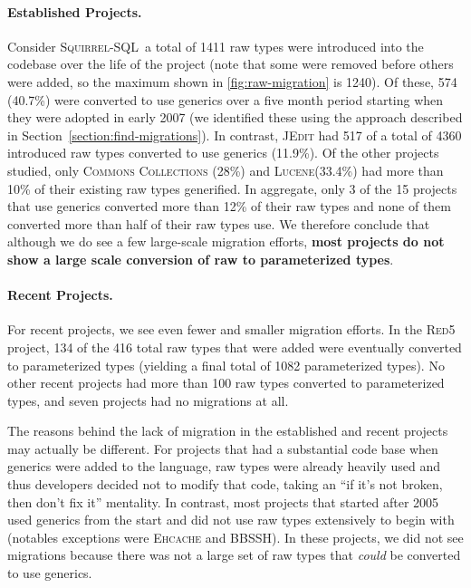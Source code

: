 \documentclass{svjour3}
\newcommand{\squirrelsql}{\textsc{Squirrel-SQL}\xspace}
\newcommand{\jedit}{\textsc{JEdit}\xspace}
\newcommand{\lucene}{\textsc{Lucene}\xspace}
\newcommand{\commons}{\textsc{Commons Collections}\xspace}
\newcommand{\bbssh}{\textsc{BBSSH}\xspace}
\newcommand{\ehcache}{\textsc{Ehcache}\xspace}
\newcommand{\red}{\textsc{Red5}\xspace}
\begin{document}

\paragraph{Established Projects.}
Consider \squirrelsql\textemdash~a total of 1411 raw types were introduced into the codebase
over the life of the project (note that some were removed before others were
added, so the maximum shown in \autoref{fig:raw-migration} is 1240).  Of these,
574 (40.7\%) were converted to use generics over a five month period starting
when they were adopted in early 2007 (we identified these using the approach
described in Section~\ref{section:find-migrations}). In contrast, \jedit had 517 of a total of 
4360 introduced raw types converted to use generics (11.9\%). 
Of the other projects studied, only \commons
(28\%) and \lucene (33.4\%) had more than 10\% of their existing raw types
generified.  In aggregate, only 3 of the 15 projects that use generics
converted more than 12\% of their raw types and none of them converted more than
half of their raw types use.
We therefore conclude that although we do see a few large-scale migration efforts,
\textbf{most projects do not show a large scale conversion of raw to parameterized types}.

\paragraph{Recent Projects.} For recent projects, we see
even fewer and smaller migration efforts. In the \red project, 134 of the 416
total raw types that were added were eventually converted to parameterized
types (yielding a final total of 1082 parameterized types).  No other recent
projects had more than 100 raw types converted to parameterized types, and seven
projects had no migrations at all.

The reasons behind the lack of migration in the established and recent projects may actually be
different.  For projects that had a substantial code base when generics were
added to the language, raw types were already heavily used and thus developers
decided not to modify that code, taking an ``if it's not broken, then don't fix
it'' mentality.  In contrast, most projects that started after 2005 used
generics from the start and did not use raw types extensively to begin with
(notables exceptions were \ehcache and \bbssh).  In these projects, we did not
see migrations because there was not a large set of raw types that \emph{could}
be converted to use generics.
\end{document}
